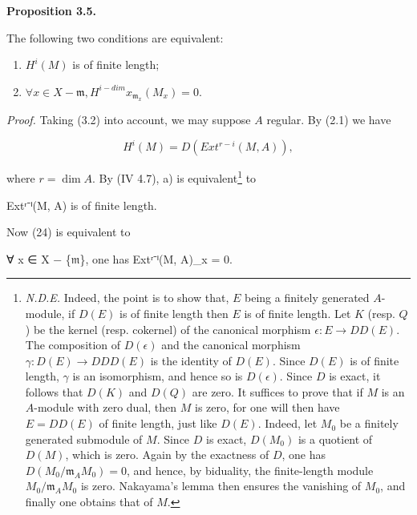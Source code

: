 \documentclass[
  11pt,
  a4paper,
]{book}
\newenvironment{Shaded}{}{}
\newcommand{\NormalTok}[1]{#1}
\begin{document}
\textbf{Proposition 3.5.}

The following two conditions are equivalent:

\begin{enumerate}
\def\labelenumi{\alph{enumi})}
\item
  \(H^{i}(M)\) is of finite length;
\item
  \(\forall x \in X - {\mathfrak{m}}, H^{i-dim} {x}_{\mathfrak{m}_{x}}(M_{x}) = 0\).
\end{enumerate}

\emph{Proof.} Taking (3.2) into account, we may suppose \(A\) regular.
By (2.1) we have

\[ H^{i}(M) = D(Ext^{r-i}(M, A)), \]

where \(r = \dim A\). By (IV 4.7), a) is equivalent\footnote{\emph{N.D.E.}
  Indeed, the point is to show that, \(E\) being a finitely generated
  \(A\)-module, if \(D(E)\) is of finite length then \(E\) is of finite
  length. Let \(K\) (resp. \(Q\)) be the kernel (resp. cokernel) of the
  canonical morphism \(\epsilon: E \to DD(E)\). The composition of
  \(D(\epsilon)\) and the canonical morphism \(\gamma: D(E) \to DDD(E)\)
  is the identity of \(D(E)\). Since \(D(E)\) is of finite length,
  \(\gamma\) is an isomorphism, and hence so is \(D(\epsilon)\). Since
  \(D\) is exact, it follows that \(D(K)\) and \(D(Q)\) are zero. It
  suffices to prove that if \(M\) is an \(A\)-module with zero dual,
  then \(M\) is zero, for one will then have \(E = DD(E)\) of finite
  length, just like \(D(E)\). Indeed, let \(M_{0}\) be a finitely
  generated submodule of \(M\). Since \(D\) is exact, \(D(M_{0})\) is a
  quotient of \(D(M)\), which is zero. Again by the exactness of \(D\),
  one has \(D(M_{0}/\mathfrak{m}_{A} M_{0}) = 0\), and hence, by
  biduality, the finite-length module \(M_{0}/\mathfrak{m}_{A} M_{0}\)
  is zero. Nakayama's lemma then ensures the vanishing of \(M_{0}\), and
  finally one obtains that of \(M\).} to

\begin{Shaded}
\begin{Highlighting}[]
\NormalTok{Extʳ⁻ⁱ(M, A) is of finite length.}
\end{Highlighting}
\end{Shaded}

Now (24) is equivalent to

\begin{Shaded}
\begin{Highlighting}[]
\NormalTok{∀ x ∈ X − \{𝔪\}, one has Extʳ⁻ⁱ(M, A)\_x = 0.}
\end{Highlighting}
\end{Shaded}
\end{document}
